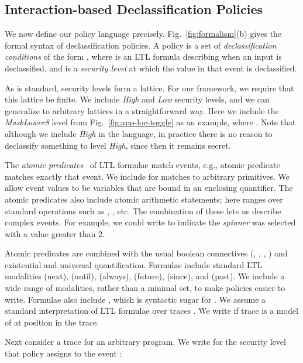 \documentclass{llncs}
\begin{document}
\subsection{Interaction-based Declassification Policies}
\label{sec:policies}

We now define our policy language precisely.
Fig.~\ref{fig:formalism}(b) gives the formal syntax of
declassification policies.  A policy  is a set of
\emph{declassification conditions}  of the form ,
where  is an LTL formula describing when an input is
declassified, and  is a \emph{security level} at which the value
in that event is declassified.

As is standard, security levels  form a lattice.  For our
framework, we require that this lattice be finite.  We include
\textit{High} and \textit{Low} security levels, and we can generalize
to arbitrary lattices in a straightforward way. Here we include the
\textit{MaskLower8} level from Fig.~\ref{fig:app-loc-toggle} as an
example, where .  Note that although we include
\textit{High} in the language, in practice there is no reason to
declassify something to level \textit{High}, since then it remains
secret.

The \emph{atomic predicates}~ of LTL formulae match events,
e.g., atomic predicate  matches exactly that event.
We include  for matches to
arbitrary primitives. We allow event values to be
variables that are bound in an enclosing quantifier. The atomic
predicates also include atomic arithmetic
statements; here  ranges over standard operations such as ,
, etc.  
The combination of these lets us describe complex
events. For example, we could write
 to indicate the
\emph{spinner} was selected with a value greater than 2.

Atomic predicates are combined with the usual boolean connectives
(, , , ) and existential and
universal quantification.  Formulae include standard LTL
modalities  (next), 
(until),  (always),  (future), 
(since), and  (past). We include a wide range of
modalities, rather than a minimal set, to make policies easier to write.
Formulae also include
, which is syntactic sugar for .
We assume a standard interpretation of LTL formulae over
traces \cite{Lichtenstein:85}.
We write  if trace  is a model of  at
position  in the trace.







Next consider a trace  for an arbitrary program.
We write  for the security level that policy
 assigns to the event :
\end{document}

